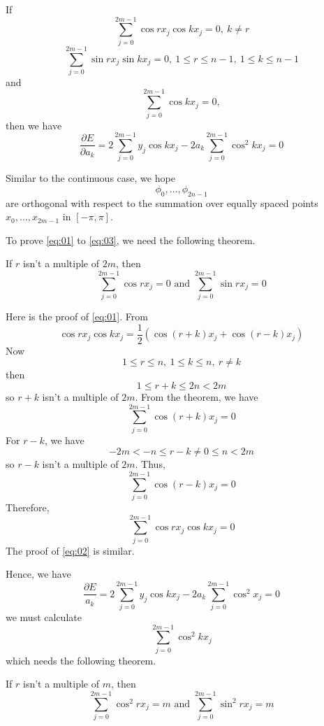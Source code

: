 If \begin{equation}
    \sum_{j=0}^{2m-1} \cos r x_j \cos k x_j = 0,\ k \neq r \label{eq:01}
\end{equation}
\begin{equation}
    \sum_{j=0}^{2m-1} \sin r x_j \sin k x_j = 0,\ 1 \le r \le n-1,\ 1 \le k \le n-1 \label{eq:02}
\end{equation}
and \begin{equation}
    \sum_{j=0}^{2m-1} \cos k x_j = 0, \label{eq:03}
\end{equation}
then we have \[
    \frac{\partial E}{\partial a_k} = 2 \sum_{j=0}^{2m-1} y_j \cos k x_j - 2 a_k \sum_{j=0}^{2m-1} \cos^2 kx_j = 0
\]

Similar to the continuous case, we hope \[
    \phi_0, \dots, \phi_{2n-1}
\]
are orthogonal with respect to the summation over equally spaced points $x_0, \dots, x_{2m-1}$ in $[-\pi, \pi]$.

\newpage

To prove \eqref{eq:01} to \eqref{eq:03}, we need the following theorem.

\begin{theorem}
    If $r$ isn't a multiple of  $2m$, then \[
        \sum_{j=0}^{2m-1} \cos r x_j = 0
    \mbox{ and }
        \sum_{j=0}^{2m-1} \sin r x_j = 0
    \]
\end{theorem}

Here is the proof of \eqref{eq:01}. From \[
    \cos r x_j \cos k x_j = \frac{1}{2} (\cos (r+k) x_j + \cos (r-k) x_j)
\]
Now \[
    1 \le r \le n,\ 1 \le k \le n,\ r \neq k
\]
then \[
    1 \le r+k \le 2n < 2m
\]
so $r+k$ isn't a multiple of $2m$. From the theorem, we have \[
    \sum_{j=0}^{2m-1} \cos (r+k) x_j = 0
\]
For $r-k$, we have \[
    -2m < -n \le r-k \neq 0 \le n < 2m
\]
so $r-k$ isn't a multiple of $2m$. Thus, \[
    \sum_{j=0}^{2m-1} \cos (r-k) x_j = 0
\]
Therefore, \[
    \sum_{j=0}^{2m-1} \cos r x_j \cos k x_j = 0
\]
The proof of \eqref{eq:02} is similar.

\vspace{1em}

Hence, we have \[
    \frac{\partial E}{a_k} = 2 \sum_{j=0}^{2m-1} y_j \cos k x_j - 2 a_k \sum_{j=0}^{2m-1} \cos^2 x_j = 0
\]
we must calculate \[
    \sum_{j=0}^{2m-1} \cos^2 k x_j
\]
which needs the following theorem.

\begin{theorem}\label{thm:1}
    If $r$ isn't a multiple of $m$, then \[
        \sum_{j=0}^{2m-1} \cos^2 r x_j = m
        \mbox{ and }
        \sum_{j=0}^{2m-1} \sin^2 r x_j = m
    \]
\end{theorem}

